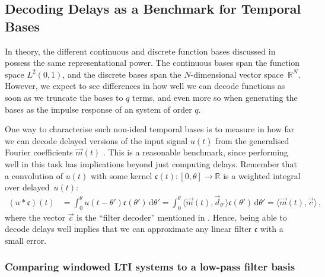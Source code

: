 \subsection{Decoding Delays as a Benchmark for Temporal Bases}
\label{sec:comparing_temporal_bases}

In theory, the different continuous and discrete function bases discussed in  possess the same representational power.
The continuous bases span the function space $L^2(0, 1)$, and the discrete bases span the $N$-dimensional vector space~$\mathbb{R}^N$.
However, we expect to see differences in how well we can decode functions as soon as we truncate the bases to $q$ terms, and even more so when generating the bases as the impulse response of an \LTI system of order $q$.

One way to characterise such non-ideal temporal bases is to measure in how far we can decode delayed versions of the input signal $u(t)$ from the generalised Fourier coefficients $\vec m(t)$ \citep[cf.][]{voelker2018improving}.
This is a reasonable benchmark, since performing well in this task has implications beyond just computing delays. 
Remember that a convolution of $u(t)$ with some kernel $\mathfrak{c}(t) : [0, \theta] \longrightarrow \mathbb{R}$ is a weighted integral over delayed~$u(t)$:
\begin{align*}
	(u \ast \mathfrak{c})(t)
		&= \int_{0}^\theta \!\! u(t - \theta') \mathfrak{c}(\theta') \, \mathrm{d}\theta'
		 = \int_{0}^\theta \!\! \langle \vec m(t), \vec d_{\theta'} \rangle \mathfrak{c}(\theta') \, \mathrm{d}\theta'
		 = \langle \vec m(t), \vec c \rangle \,,
\end{align*}
where the vector $\vec c$ is the \enquote{filter decoder} mentioned in .
Hence, being able to decode delays well implies that we can approximate any linear filter $\mathfrak{c}$ with a small error.

\subsubsection{Comparing windowed LTI systems to a low-pass filter basis}

